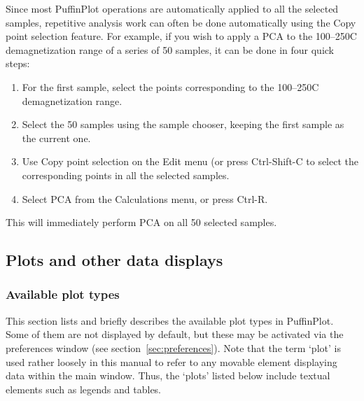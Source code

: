 \documentclass[a4paper,british]{article}
\newcommand{\ppcmd}[1]{\textsf{#1}} %
\newcommand{\caps}[1]{\MakeTextUppercase{#1}} %
\begin{document}
Since most PuffinPlot operations are automatically applied to all the
selected samples, repetitive analysis work can often be done automatically
using the \ppcmd{Copy point selection} feature. For example, if you wish to
apply a \caps{pca} to the 100--250\textdegree{}C demagnetization range of a
series of 50 samples, it can be done in four quick steps:

\begin{enumerate}

\item For the first sample, select the points corresponding to the
  100--250\textdegree{}C demagnetization range.

\item Select the 50 samples using the sample chooser, keeping the
  first sample as the current one.

\item Use \ppcmd{Copy point selection} on the \ppcmd{Edit} menu
  (or press \ppcmd{Ctrl-Shift-C} to select the corresponding points
  in all the selected samples.

\item Select \ppcmd{\caps{pca}} from the \ppcmd{Calculations} menu,
  or press \ppcmd{Ctrl-R}.

\end{enumerate}

This will immediately perform \caps{pca} on all 50 selected samples.

\subsection{Plots and other data displays}

\subsubsection{\label{sec:plot-types}Available plot types}

This section lists and briefly describes the available plot types in
PuffinPlot. Some of them are not displayed by default, but these may be
activated via the preferences window (see section~\ref{sec:preferences}).
Note that the term `plot' is used rather loosely in this manual to refer to
any movable element displaying data within the main window. Thus, the `plots'
listed below include textual elements such as legends and tables.
\end{document}
